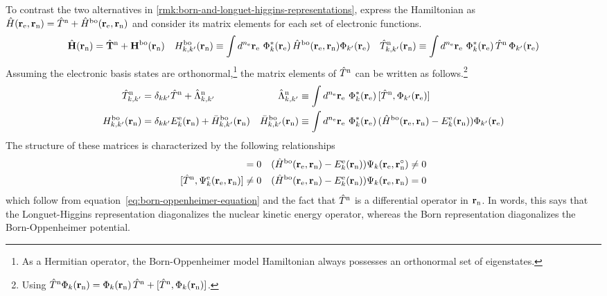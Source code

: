 \documentclass[11pt]{article}
\begin{document}
\begin{samepage}
\begin{rmk}
To contrast the two alternatives in \cref{rmk:born-and-longuet-higgins-representations}, express the Hamiltonian as
$
  \hat{H}(\mathbf{r}_{\mathrm{e}},\mathbf{r}_{\mathrm{n}})
=
  \hat{T}^{\mathrm{n}}
+
  \hat{H}^{\mathrm{bo}}(\mathbf{r}_{\mathrm{e}},\mathbf{r}_{\mathrm{n}})
$
and consider its matrix elements for each set of electronic functions.
\begin{align}
  \hat{\mathbf{H}}(\mathbf{r}_{\mathrm{n}})
=
  \hat{\mathbf{T}}^{\mathrm{n}}
+
  \mathbf{H}^{\mathrm{bo}}(\mathbf{r}_{\mathrm{n}})
&&
  H_{k,k'}^{\mathrm{bo}}(\mathbf{r}_{\mathrm{n}})
\equiv
  \int
  d^{n_{\mathrm{e}}}\mathbf{r}_{\mathrm{e}}\,\,
  \Phi _k^*(\mathbf{r}_{\mathrm{e}})\,
  \hat{H}^{\mathrm{bo}}(\mathbf{r}_{\mathrm{e}},\mathbf{r}_{\mathrm{n}})
  \Phi _{k'}(\mathbf{r}_{\mathrm{e}})
&&
  \hat{T}_{k,k'}^{\mathrm{n}}(\mathbf{r}_{\mathrm{n}})
\equiv
  \int
  d^{n_{\mathrm{e}}}\mathbf{r}_{\mathrm{e}}\,\,
  \Phi _k^*(\mathbf{r}_{\mathrm{e}})\,
  \hat{T}^{\mathrm{n}}\,
  \Phi _{k'}(\mathbf{r}_{\mathrm{e}})
\end{align}
Assuming the electronic basis states are orthonormal,\footnote{As a Hermitian operator, the Born-Oppenheimer model Hamiltonian always possesses an orthonormal set of eigenstates.} the matrix elements of $\hat{T}^{\mathrm{n}}$ can be written as follows.\footnote{
Using
$
  \hat{T}^{\mathrm{n}}\Phi _k(\mathbf{r}_{\mathrm{n}})
=
  \Phi _k(\mathbf{r}_{\mathrm{n}})\,\hat{T}^{\mathrm{n}}
+
  [\hat{T}^{\mathrm{n}}, \Phi _k(\mathbf{r}_{\mathrm{n}})]
$.
}
\begin{align}
  \hat{T}_{k,k'}^{\mathrm{n}}
&=
  \delta _{kk'}
  \hat{T}^{\mathrm{n}}
+
  \hat{\Lambda }_{k,k'}^{\mathrm{n}}
&
  \hat{\Lambda }_{k,k'}^{\mathrm{n}}
&\equiv
  \int
  d^{n_{\mathrm{e}}}\mathbf{r}_{\mathrm{e}}\,\,
  \Phi _k^*(\mathbf{r}_{\mathrm{e}})\,
  [
    \hat{T}^{\mathrm{n}}
  ,
    \Phi _{k'}(\mathbf{r}_{\mathrm{e}})
  ]
\\
  H_{k,k'}^{\mathrm{bo}}(\mathbf{r}_{\mathrm{n}})
&=
  \delta _{kk'}
  E_k^{\mathrm{e}}(\mathbf{r}_{\mathrm{n}})
+
  \bar{H}_{k,k'}^{\mathrm{bo}}(\mathbf{r}_{\mathrm{n}})
&
  \bar{H}_{k,k'}^{\mathrm{bo}}(\mathbf{r}_{\mathrm{n}})
&\equiv
  \int
  d^{n_{\mathrm{e}}}\mathbf{r}_{\mathrm{e}}\,\,
  \Phi _k^*(\mathbf{r}_{\mathrm{e}})\,
  (\hat{H}^{\mathrm{bo}}(\mathbf{r}_{\mathrm{e}},\mathbf{r}_{\mathrm{n}}) - E_k^{\mathrm{e}}(\mathbf{r}_{\mathrm{n}}))
  \Phi _{k'}(\mathbf{r}_{\mathrm{e}})
\end{align}
The structure of these matrices is characterized by the following relationships
\begin{align}
  [
    \op{T}^\mr{n}
  ,
    \Y_k^\mr{e}(\bo{r}_\mr{e},\bo{r}_\mr{n}^\circ)
  ]
=
  0
&&
  (\op{H}^{\mr{bo}}(\bo{r}_\mr{e},\bo{r}_\mr{n}) - E_k^\mr{e}(\bo{r}_\mr{n}))
  \Y_k(\bo{r}_\mr{e}, \bo{r}_\mr{n}^\circ)
\neq
  0
\\
  [
    \op{T}^\mr{n}
  ,
    \Y_k^\mr{e}(\bo{r}_\mr{e},\bo{r}_\mr{n})
  ]
\neq
  0
&&
  (\op{H}^{\mr{bo}}(\bo{r}_\mr{e},\bo{r}_\mr{n}) - E_k^\mr{e}(\bo{r}_\mr{n}))
  \Y_k(\bo{r}_\mr{e}, \bo{r}_\mr{n})
=
  0
\end{align}
which follow from equation~\ref{eq:born-oppenheimer-equation} and the fact that $\hat{T}^{\mathrm{n}}$ is a differential operator in $\mathbf{r}_{\mathrm{n}}$.
In words, this says that the Longuet-Higgins representation diagonalizes the nuclear kinetic energy operator, whereas the Born representation diagonalizes the Born-Oppenheimer potential.
\end{rmk}
\end{samepage}
\end{document}
